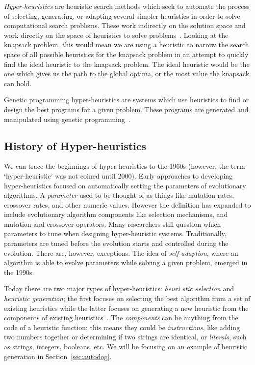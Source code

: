\documentclass{sig-alternate}
\begin{document}
\textit{Hyper-heuristics} are heuristic search methods which seek to automate the process of selecting, generating, or adapting several simpler heuristics in order to solve computational search problems. These work indirectly on the solution space and work directly on the space of heuristics to solve problems~\cite{tauritz:tutorial}. Looking at the knapsack problem, this would mean we are using a heuristic to narrow the search space of all possible heuristics for the knapsack problem in an attempt to quickly find the ideal heuristic to the knapsack problem. The ideal heuristic would be the one which gives us the path to the global optima, or the most value the knapsack can hold.

Genetic programming hyper-heuristics are systems which use heuristics to find or design the best programs for a given problem. These programs are generated and manipulated using genetic programming~\cite{harris:2015}.

\subsection{History of Hyper-heuristics}
\label{sec:history}
We can trace the beginnings of hyper-heuristics to the 1960s (however, the term `hyper-heuristic' was not coined until 2000). Early approaches to developing hyper-heuristics focused on automatically setting the parameters of evolutionary algorithms. A \textit{parameter} used to be thought of as things like mutation rates, crossover rates, and other numeric values. However the definition has expanded to include evolutionary algorithm components like selection mechanisms, and mutation and crossover operators. Many researchers still question which parameters to tune when designing hyper-heuristic systems. Traditionally, parameters are tuned before the evolution starts and controlled during the evolution. There are, however, exceptions. The idea of \textit{self-adaption}, where an algorithm is able to evolve parameters while solving a given problem, emerged in the 1990s.~\cite{pappa:2014}

Today there are two major types of hyper-heuristics: \textit{heuri\- stic selection} and \textit{heuristic generation}; the first focuses on selecting the best algorithm from a set of existing heuristics while the latter focuses on generating a new heuristic from the components of existing heuristics~\cite{pappa:2014}. The \textit{components} can be anything from the code of a heuristic function; this means they could be \textit{instructions}, like adding two numbers together or determining if two strings are identical, or \textit{literals}, such as strings, integers, booleans, etc. We will be focusing on an example of heuristic generation in Section~\ref{sec:autodog}.
\end{document}
